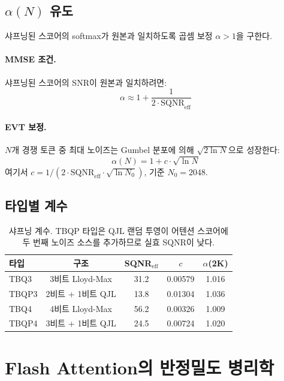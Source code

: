 \documentclass[10pt,twocolumn]{article}
\begin{document}
\subsection{$\alpha(N)$ 유도}

샤프닝된 스코어의 softmax가 원본과 일치하도록 곱셈 보정 $\alpha > 1$을 구한다.

\paragraph{MMSE 조건.} 샤프닝된 스코어의 SNR이 원본과 일치하려면:
\begin{equation}
\alpha \approx 1 + \frac{1}{2 \cdot \text{SQNR}_\text{eff}}
\end{equation}

\paragraph{EVT 보정.} $N$개 경쟁 토큰 중 최대 노이즈는 Gumbel 분포에 의해 $\sqrt{2\ln N}$으로 성장한다:
\begin{equation}
\boxed{\alpha(N) = 1 + c \cdot \sqrt{\ln N}}
\end{equation}
여기서 $c = 1/(2 \cdot \text{SQNR}_\text{eff} \cdot \sqrt{\ln N_0})$, 기준 $N_0 = 2048$.

\subsection{타입별 계수}

\begin{table}[h]
\centering
\small
\begin{tabular}{@{}lcccc@{}}
\toprule
타입 & 구조 & SQNR$_\text{eff}$ & $c$ & $\alpha$(2K) \\
\midrule
TBQ3  & 3비트 Lloyd-Max     & 31.2 & 0.00579 & 1.016 \\
TBQP3 & 2비트 + 1비트 QJL   & 13.8 & 0.01304 & 1.036 \\
TBQ4  & 4비트 Lloyd-Max     & 56.2 & 0.00326 & 1.009 \\
TBQP4 & 3비트 + 1비트 QJL   & 24.5 & 0.00724 & 1.020 \\
\bottomrule
\end{tabular}
\caption{샤프닝 계수. TBQP 타입은 QJL 랜덤 투영이 어텐션 스코어에 두 번째 노이즈 소스를 추가하므로 실효 SQNR이 낮다.}
\end{table}

\section{Flash Attention의 반정밀도 병리학}
\label{sec:precision}
\end{document}
